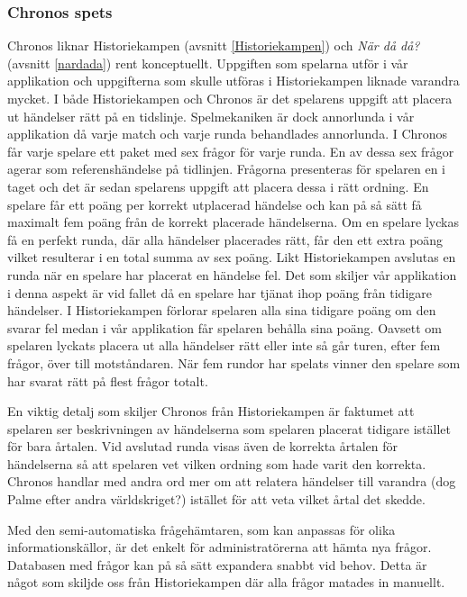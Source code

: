 \documentclass[a4paper, 11pt]{article}
\begin{document}
\subsubsection{Chronos spets}
Chronos liknar Historiekampen (avsnitt \ref{Historiekampen}) och \textit{När då då?} (avsnitt \ref{nardada}) rent konceptuellt. Uppgiften som spelarna utför i vår applikation och uppgifterna som skulle utföras i Historiekampen liknade varandra mycket. I både Historiekampen och Chronos är det spelarens uppgift att placera ut händelser rätt på en tidslinje. Spelmekaniken är dock annorlunda i vår applikation då varje match och varje runda behandlades annorlunda. I Chronos får varje spelare ett paket med sex frågor för varje runda. En av dessa sex frågor agerar som referenshändelse på tidlinjen. Frågorna presenteras för spelaren en i taget och det är sedan spelarens uppgift att placera dessa i rätt ordning. En spelare får ett poäng per korrekt utplacerad händelse och kan på så sätt få maximalt fem poäng från de korrekt placerade händelserna. Om en spelare lyckas få en perfekt runda, där alla händelser placerades rätt, får den ett extra poäng vilket resulterar i en total summa av sex poäng. Likt Historiekampen avslutas en runda när en spelare har placerat en händelse fel. Det som skiljer vår applikation i denna aspekt är vid fallet då en spelare har tjänat ihop poäng från tidigare händelser. I Historiekampen förlorar spelaren alla sina tidigare poäng om den svarar fel medan i vår applikation får spelaren behålla sina poäng. Oavsett om spelaren lyckats placera ut alla händelser rätt eller inte så går turen, efter fem frågor, över till motståndaren. När fem rundor har spelats vinner den spelare som har svarat rätt på flest frågor totalt.  

En viktig detalj som skiljer Chronos från Historiekampen är faktumet att spelaren ser beskrivningen av händelserna som spelaren placerat tidigare istället för bara årtalen. Vid avslutad runda visas även de korrekta årtalen för händelserna så att spelaren vet vilken ordning som hade varit den korrekta. Chronos handlar med andra ord mer om att relatera händelser till varandra (dog Palme efter andra världskriget?) istället för att veta vilket årtal det skedde.

Med den semi-automatiska frågehämtaren, som kan anpassas för olika informationskällor, är det enkelt för administratörerna att hämta nya frågor. Databasen med frågor kan på så sätt expandera snabbt vid behov. Detta är något som skiljde oss från Historiekampen där alla frågor matades in manuellt.
\end{document}
